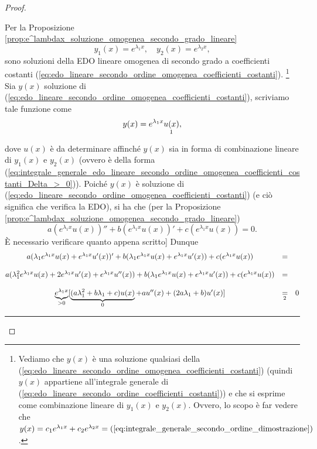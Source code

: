 \begin{proof}
\begin{enumerate}
		Per la Proposizione \ref{prop:e^lambdax_soluzione_omogenea_secondo_grado_lineare}
		\begin{equation*}
			y_1(x) = e^{\lambda_1 x},\quad y_2(x) = e^{\lambda_2 x},
		\end{equation*}
		sono soluzioni della EDO lineare omogenea di secondo grado a coefficienti costanti (\ref{eq:edo_lineare_secondo_ordine_omogenea_coefficienti_costanti}).
		\footnote{Vediamo che $y(x)$ è una soluzione qualsiasi della (\ref{eq:edo_lineare_secondo_ordine_omogenea_coefficienti_costanti}) (quindi $y(x)$ appartiene all'integrale generale di (\ref{eq:edo_lineare_secondo_ordine_coefficienti_costanti})) e che si esprime come combinazione lineare di $y_1(x)$ e $y_2(x)$. Ovvero, lo scopo è far vedere che $y(x)=c_1 e^{\lambda_1x}+c_2e^{\lambda_2 x}=(\ref{eq:integrale_generale_secondo_ordine_dimostrazione})$.} Sia $y(x)$ soluzione di  (\ref{eq:edo_lineare_secondo_ordine_omogenea_coefficienti_costanti}), scriviamo tale funzione come
		\begin{equation}\label{eq:integrale_generale_secondo_ordine_dimostrazione}
			y(x) = e^{\lambda_1 x}\underset{\footnotemark}{u(x)},
		\end{equation}
		dove $u(x)$ è da determinare affinché $y(x)$ sia in forma di combinazione lineare di $y_1(x)$ e $y_2(x)$ (ovvero è della forma (\ref{eq:integrale_generale_edo_lineare_secondo_ordine_omogenea_coefficienti_costanti_Delta_>_0})).
		Poiché $y(x)$ è soluzione di  (\ref{eq:edo_lineare_secondo_ordine_omogenea_coefficienti_costanti}) (e ciò significa che verifica la EDO), si ha che (per la Proposizione \ref{prop:e^lambdax_soluzione_omogenea_secondo_grado_lineare})
		\begin{equation*}
			a(e^{\lambda_1x}u(x))''+ b(e^{\lambda_1x}u(x))'+ c (e^{\lambda_1x}u(x)) = 0.
		\end{equation*}
		È necessario verificare quanto appena scritto] Dunque
		\begin{equation}\label{eq:dimostrazione_th_soluzioni_edo_secondo_ordine}
			\begin{matrix}
				a(\lambda_1e^{\lambda_1x}u(x)+e^{\lambda_1x}u'(x))' + b(\lambda_1 e^{\lambda_1 x}u(x) + e^{\lambda_1x}u'(x)) + c(e^{\lambda_1x}u(x)) &=&\\\\
				a(\lambda_1^2e^{\lambda_1 x}u(x) + 2 e^{\lambda_1 x} u'(x) + e^{\lambda_1 x}u''(x))+ b (\lambda_1 e^{\lambda_1 x}u(x) + e^{\lambda_1 x}u'(x)) + 
				c(e^{\lambda_1 x}u(x)) &=&\\\\
				 \underbrace{e^{\lambda_1 x}}_{>0} [\underbrace{(a\lambda_1^2+b\lambda_1 +c) u(x)}_{0} + a u''(x)+(2a\lambda_1 + b)u'(x)] &\underset{\footnotemark}{=}& 0
			\end{matrix}
		\end{equation}
		\hrule\vspace{-12px}

\end{enumerate}
\end{proof}
